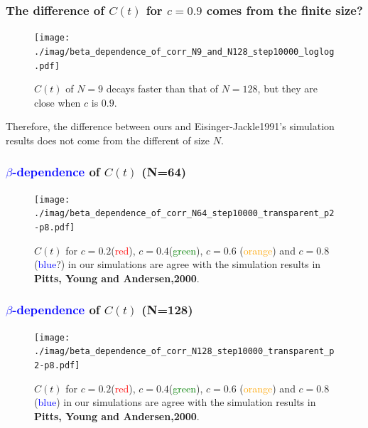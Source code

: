 \documentclass[8pt]{beamer}
\begin{document}
\begin{frame}
	\frametitle{The difference of $C(t)$ for $c=0.9$ comes from the finite size?}
	\begin{figure}
		\centering
		\texttt{[image: ./imag/beta\_dependence\_of\_corr\_N9\_and\_N128\_step10000\_loglog.pdf]}
		\setlength{\abovecaptionskip}{0pt}
		\caption{$C(t)$ of $N=9$ decays faster than that of $N=128$, but they are close when $c$ is $0.9$. }
	\end{figure}
Therefore, the difference between ours and Eisinger-Jackle1991's simulation results does not come from the different of size $N$.
\end{frame}


\begin{frame}
	\frametitle{{\textcolor{blue}{$\beta$-dependence}} of $C(t)$ (N=64)}
	\begin{figure}
		\centering
		\texttt{[image: ./imag/beta\_dependence\_of\_corr\_N64\_step10000\_transparent\_p2-p8.pdf]}
		\setlength{\abovecaptionskip}{0pt}
		\caption{$C(t)$ for $c=0.2$({\textcolor{red}{red}}), $c=0.4$({\textcolor{green}{green}}), $c=0.6$ ({\textcolor{orange}{orange}}) and $c=0.8$ ({\textcolor{blue}{blue}}?)  in our simulations  are agree with the simulation results in \textbf{Pitts, Young and Andersen,2000}.}
	\end{figure}
\end{frame}

\begin{frame}
	\frametitle{{\textcolor{blue}{$\beta$-dependence}} of $C(t)$ (N=128)}
	\begin{figure}
		\centering
		\texttt{[image: ./imag/beta\_dependence\_of\_corr\_N128\_step10000\_transparent\_p2-p8.pdf]}
		\setlength{\abovecaptionskip}{0pt}
		\caption{$C(t)$ for $c=0.2$({\textcolor{red}{red}}), $c=0.4$({\textcolor{green}{green}}), $c=0.6$ ({\textcolor{orange}{orange}}) and $c=0.8$ ({\textcolor{blue}{blue}})  in our simulations  are agree with the simulation results in \textbf{Pitts, Young and Andersen,2000}.}
	\end{figure}
\end{frame}
\end{document}
